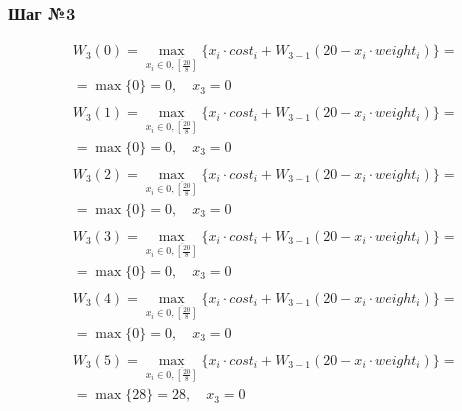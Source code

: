 \documentclass[17pt]{extarticle}
\begin{document}
\subsubsection*{Шаг №3}
\[
    \begin{aligned}
         & W_3(0)=\max_{x_i \in \overline{0, \left[\frac{20}{8}\right]}} \{x_i \cdot cost_i + W_{3-1}(20 - x_i \cdot weight_i)\}= \\& = \max \{
        0\}= 0, \quad x_3 = 0                                                                                                     \\
    \end{aligned}
\]
\[
    \begin{aligned}
         & W_3(1)=\max_{x_i \in \overline{0, \left[\frac{20}{8}\right]}} \{x_i \cdot cost_i + W_{3-1}(20 - x_i \cdot weight_i)\}= \\& = \max \{
        0\}= 0, \quad x_3 = 0                                                                                                     \\
    \end{aligned}
\]
\[
    \begin{aligned}
         & W_3(2)=\max_{x_i \in \overline{0, \left[\frac{20}{8}\right]}} \{x_i \cdot cost_i + W_{3-1}(20 - x_i \cdot weight_i)\}= \\& = \max \{
        0\}= 0, \quad x_3 = 0                                                                                                     \\
    \end{aligned}
\]
\[
    \begin{aligned}
         & W_3(3)=\max_{x_i \in \overline{0, \left[\frac{20}{8}\right]}} \{x_i \cdot cost_i + W_{3-1}(20 - x_i \cdot weight_i)\}= \\& = \max \{
        0\}= 0, \quad x_3 = 0                                                                                                     \\
    \end{aligned}
\]
\[
    \begin{aligned}
         & W_3(4)=\max_{x_i \in \overline{0, \left[\frac{20}{8}\right]}} \{x_i \cdot cost_i + W_{3-1}(20 - x_i \cdot weight_i)\}= \\& = \max \{
        0\}= 0, \quad x_3 = 0                                                                                                     \\
    \end{aligned}
\]
\[
    \begin{aligned}
         & W_3(5)=\max_{x_i \in \overline{0, \left[\frac{20}{8}\right]}} \{x_i \cdot cost_i + W_{3-1}(20 - x_i \cdot weight_i)\}= \\& = \max \{
        28\}= 28, \quad x_3 = 0                                                                                                   \\
    \end{aligned}
\]
\end{document}
